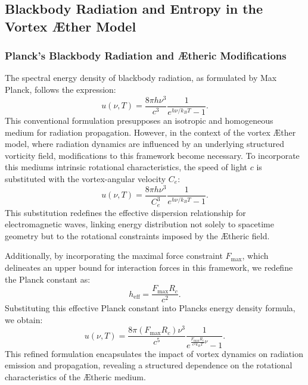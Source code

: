 
\subsection{Blackbody Radiation and Entropy in the Vortex \AE{}ther Model}


\subsubsection*{Planck's Blackbody Radiation and \AE{}theric Modifications}
The spectral energy density of blackbody radiation, as formulated by Max Planck, follows the expression:
\begin{equation*}
u(\nu, T) = \frac{8 \pi h \nu^3}{c^3} \frac{1}{e^{h \nu / k_B T} - 1}.
\end{equation*}
This conventional formulation presupposes an isotropic and homogeneous medium for radiation propagation. However, in the context of the vortex \AE{}ther model, where radiation dynamics are influenced by an underlying structured vorticity field, modifications to this framework become necessary. To incorporate this medium\rqs s intrinsic rotational characteristics, the speed of light $c$ is substituted with the vortex-angular velocity $C_e$:
\begin{equation*}
u(\nu, T) = \frac{8 \pi h \nu^3}{C_e^3} \frac{1}{e^{h \nu / k_B T} - 1}.
\end{equation*}
This substitution redefines the effective dispersion relationship for electromagnetic waves, linking energy distribution not solely to spacetime geometry but to the rotational constraints imposed by the \AE{}theric field.


Additionally, by incorporating the maximal force constraint $F_{\max}$, which delineates an upper bound for interaction forces in this framework, we redefine the Planck constant as:
\begin{equation*}
h_\text{eff} = \frac{F_{\max} R_c}{c^2}.
\end{equation*}
Substituting this effective Planck constant into Planck\rqs s energy density formula, we obtain:
\begin{equation*}
u(\nu, T) = \frac{8 \pi \left( F_{\max} R_c \right) \nu^3}{c^5} \frac{1}{e^{\frac{F_{\max} R_c}{c^2 k_B T} \nu} - 1}.
\end{equation*}
This refined formulation encapsulates the impact of vortex dynamics on radiation emission and propagation, revealing a structured dependence on the rotational characteristics of the \AE{}theric medium.


